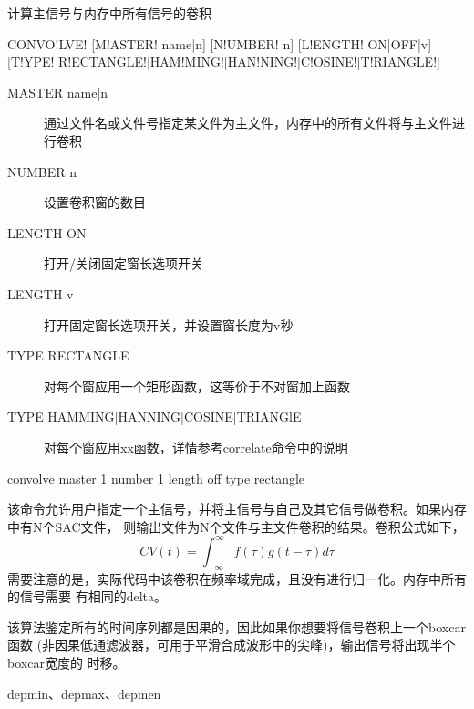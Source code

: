 \label{cmd:convolve}

计算主信号与内存中所有信号的卷积

\begin{SACSTX}
CONVO!LVE! [M!ASTER! name|n] [N!UMBER! n] [L!ENGTH! ON|OFF|v]
    [T!YPE! R!ECTANGLE!|HAM!MING!|HAN!NING!|C!OSINE!|T!RIANGLE!]
\end{SACSTX}

\begin{description}
\item [MASTER name|n] 通过文件名或文件号指定某文件为主文件，内存中的所有文件将与主文件进行卷积
\item [NUMBER n] 设置卷积窗的数目
\item [LENGTH ON] 打开/关闭固定窗长选项开关
\item [LENGTH v] 打开固定窗长选项开关，并设置窗长度为v秒
\item [TYPE RECTANGLE] 对每个窗应用一个矩形函数，这等价于不对窗加上函数
\item [TYPE HAMMING|HANNING|COSINE|TRIANGlE] 对每个窗应用xx函数，详情参考correlate命令中的说明
\end{description}

\begin{SACDFT}
convolve master 1 number 1 length off type rectangle
\end{SACDFT}

该命令允许用户指定一个主信号，并将主信号与自己及其它信号做卷积。如果内存中有N个SAC文件，
则输出文件为N个文件与主文件卷积的结果。卷积公式如下，
	\[ CV(t) = \int_{-\infty} ^\infty f(\tau)g(t-\tau)d\tau \]
需要注意的是，实际代码中该卷积在频率域完成，且没有进行归一化。内存中所有的信号需要
有相同的delta。

该算法鉴定所有的时间序列都是因果的，因此如果你想要将信号卷积上一个boxcar函数
(非因果低通滤波器，可用于平滑合成波形中的尖峰)，输出信号将出现半个boxcar宽度的
时移。

depmin、depmax、depmen
